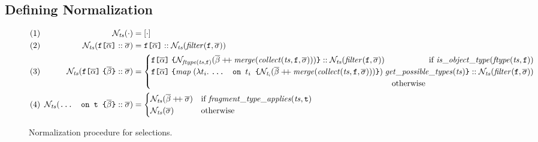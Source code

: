 \subsection{Defining Normalization}\label{subsec:normalization}

\begin{figure*}[t]
  \small
  \begin{flushright}
  \end{flushright}  
  \centering
  \vspace{-1ex}
    \begin{align*}
    &(1)\! \! \!& \tnorm{\cdot} &= [\cdot] \\
    &(2)\! \! \!& \tnorm{\fld :: \sset} &= 
       	\fld :: \tnorm{\filter{\sset}{\fkey}} \\      
    &(3)\! \! \!& \tnorm{\nfld{\overline{\beta}} :: \sset} &=
    \begin{cases}
        \nfld{\norm{\mathit{\ftype{ts}{\fkey}}}{\overline{\beta} \mdoubleplus \mathit{merge (\collect{ts}{\fkey}{\sset})}}} :: \tnorm{\filter{\sset}{\fkey}} \hfill \text{ if } 
	            \mathit{is\_object\_type (\ftype{ts}{\fkey})}\\
    \nfld{\mathit{map}\; (\lambda t_{i}.\; \ifrag{$t_{i}$}{\norm{t_{i}}{\overline{\beta} \mdoubleplus \mathit{merge (\collect{ts}{\fkey}{\sset})}}})\; \mathit{get\_possible\_types (ts)}} 
    		:: \tnorm{\filter{\sset}{\fkey}} \\
		\quad\quad\quad\quad\quad\quad\quad\quad\quad\quad\quad\quad\quad\quad\quad\quad\quad\quad\quad\quad\quad\quad\quad\quad\quad\quad\quad\quad\quad\; \text{ otherwise } 
    \end{cases}\\
    &(4)\! \! \!& \tnorm{\ifrag{t}{\overline{\beta}} :: \sset} &= 
    \begin{cases}
    \tnorm{\overline{\beta} \mdoubleplus \sset} & 
    \text{if }\mathit{fragment\_type\_applies(ts, \texttt{t})}\\
    \tnorm{\sset} & \text{otherwise}
    \end{cases}
    \end{align*}
    \caption{Normalization procedure for \gql selections. 
    }
\label{fig:normalize}
\end{figure*}

